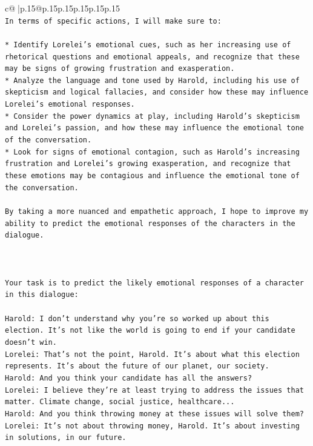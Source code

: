 \documentclass{article}
\begin{document}
{\begin{supertabular}{c@{$\;$}|p{.15\linewidth}@{}p{.15\linewidth}p{.15\linewidth}p{.15\linewidth}p{.15\linewidth}p{.15\linewidth}}
{{{\\ 
\texttt{In terms of specific actions, I will make sure to:} \\
\\ 
\texttt{* Identify Lorelei's emotional cues, such as her increasing use of rhetorical questions and emotional appeals, and recognize that these may be signs of growing frustration and exasperation.} \\
\texttt{* Analyze the language and tone used by Harold, including his use of skepticism and logical fallacies, and consider how these may influence Lorelei's emotional responses.} \\
\texttt{* Consider the power dynamics at play, including Harold's skepticism and Lorelei's passion, and how these may influence the emotional tone of the conversation.} \\
\texttt{* Look for signs of emotional contagion, such as Harold's increasing frustration and Lorelei's growing exasperation, and recognize that these emotions may be contagious and influence the emotional tone of the conversation.} \\
\\ 
\texttt{By taking a more nuanced and empathetic approach, I hope to improve my ability to predict the emotional responses of the characters in the dialogue.} \\
\\ 
\\ 
\\ 
\texttt{Your task is to predict the likely emotional responses of a character in this dialogue:} \\
\\ 
\texttt{Harold: I don't understand why you're so worked up about this election. It's not like the world is going to end if your candidate doesn't win.} \\
\texttt{Lorelei: That's not the point, Harold. It's about what this election represents. It's about the future of our planet, our society.} \\
\texttt{Harold: And you think your candidate has all the answers? } \\
\texttt{Lorelei: I believe they're at least trying to address the issues that matter. Climate change, social justice, healthcare...} \\
\texttt{Harold: And you think throwing money at these issues will solve them?} \\
\texttt{Lorelei: It's not about throwing money, Harold. It's about investing in solutions, in our future.} \\
}}}
\end{supertabular}}
\end{document}
